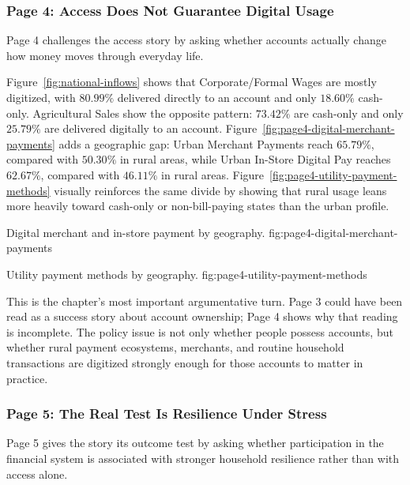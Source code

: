 \documentclass[../main.tex]{subfiles}
\begin{document}
\subsubsection{Page 4: Access Does Not Guarantee Digital Usage}
\label{subsubsec:page4-usage}

Page 4 challenges the access story by asking whether accounts actually change
how money moves through everyday life.

Figure~\ref{fig:national-inflows} shows that Corporate/Formal Wages are mostly
digitized, with \(80.99\%\) delivered directly to an account and only
\(18.60\%\) cash-only. Agricultural Sales show the opposite pattern:
\(73.42\%\) are cash-only and only \(25.79\%\) are delivered digitally to an
account. Figure~\ref{fig:page4-digital-merchant-payments} adds a geographic gap:
Urban Merchant Payments reach \(65.79\%\), compared with \(50.30\%\) in rural
areas, while Urban In-Store Digital Pay reaches \(62.67\%\), compared with
\(46.11\%\) in rural areas. Figure~\ref{fig:page4-utility-payment-methods}
visually reinforces the same divide by showing that rural usage leans more
heavily toward cash-only or non-bill-paying states than the urban profile.

{Digital merchant and in-store payment by geography.}
{fig:page4-digital-merchant-payments}


{Utility payment methods by geography.}
{fig:page4-utility-payment-methods}

This is the chapter's most important argumentative turn. Page 3 could have been
read as a success story about account ownership; Page 4 shows why that reading
is incomplete. The policy issue is not only whether people possess accounts,
but whether rural payment ecosystems, merchants, and routine household
transactions are digitized strongly enough for those accounts to matter in
practice.

\subsubsection{Page 5: The Real Test Is Resilience Under Stress}
\label{subsubsec:page5-resilience}

Page 5 gives the story its outcome test by asking whether participation in the
financial system is associated with stronger household resilience rather than
with access alone.
\end{document}
